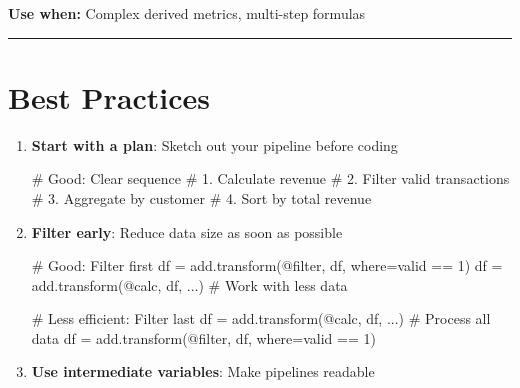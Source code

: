 \documentclass[
  letterpaper,
]{scrbook}
\newenvironment{Shaded}{\begin{snugshade}}{\end{snugshade}}
\newcommand{\CommentTok}[1]{\textcolor[rgb]{0.37,0.37,0.37}{#1}}
\newcommand{\NormalTok}[1]{\textcolor[rgb]{0.00,0.23,0.31}{#1}}
\newcommand{\OperatorTok}[1]{\textcolor[rgb]{0.37,0.37,0.37}{#1}}
\newcommand{\StringTok}[1]{\textcolor[rgb]{0.13,0.47,0.30}{#1}}
\begin{document}
\textbf{Use when:} Complex derived metrics, multi-step formulas

\begin{center}\rule{0.5\linewidth}{0.5pt}\end{center}

\section{Best Practices}\label{best-practices-4}

\begin{enumerate}
\def\labelenumi{\arabic{enumi}.}
\item
  \textbf{Start with a plan}: Sketch out your pipeline before coding

\begin{Shaded}
\begin{Highlighting}[]
\CommentTok{\# Good: Clear sequence}
\CommentTok{\# 1. Calculate revenue}
\CommentTok{\# 2. Filter valid transactions}
\CommentTok{\# 3. Aggregate by customer}
\CommentTok{\# 4. Sort by total revenue}
\end{Highlighting}
\end{Shaded}
\item
  \textbf{Filter early}: Reduce data size as soon as possible

\begin{Shaded}
\begin{Highlighting}[]
\CommentTok{\# Good: Filter first}
\NormalTok{df }\OperatorTok{=}\NormalTok{ add.transform(}\StringTok{\textquotesingle{}@filter\textquotesingle{}}\NormalTok{, df, where}\OperatorTok{=}\StringTok{\textquotesingle{}valid == 1\textquotesingle{}}\NormalTok{)}
\NormalTok{df }\OperatorTok{=}\NormalTok{ add.transform(}\StringTok{\textquotesingle{}@calc\textquotesingle{}}\NormalTok{, df, ...)  }\CommentTok{\# Work with less data}

\CommentTok{\# Less efficient: Filter last}
\NormalTok{df }\OperatorTok{=}\NormalTok{ add.transform(}\StringTok{\textquotesingle{}@calc\textquotesingle{}}\NormalTok{, df, ...)  }\CommentTok{\# Process all data}
\NormalTok{df }\OperatorTok{=}\NormalTok{ add.transform(}\StringTok{\textquotesingle{}@filter\textquotesingle{}}\NormalTok{, df, where}\OperatorTok{=}\StringTok{\textquotesingle{}valid == 1\textquotesingle{}}\NormalTok{)}
\end{Highlighting}
\end{Shaded}
\item
  \textbf{Use intermediate variables}: Make pipelines readable


\end{enumerate}
\end{document}
